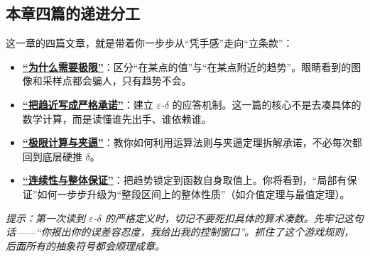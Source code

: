 \subsection*{本章四篇的递进分工}

这一章的四篇文章，就是带着你一步步从“凭手感”走向“立条款”：

\begin{itemize}
\item \hyperref[sec:02-Calculus/02-Limits-and-Continuity/01]{\textbf{“为什么需要极限”}}：区分“在某点的值”与“在某点附近的趋势”。眼睛看到的图像和采样点都会骗人，只有趋势不会。
\item \hyperref[sec:02-Calculus/02-Limits-and-Continuity/02]{\textbf{“把趋近写成严格承诺”}}：建立 $\varepsilon$-$\delta$ 的应答机制。这一篇的核心不是去凑具体的数学计算，而是读懂谁先出手、谁依赖谁。
\item \hyperref[sec:02-Calculus/02-Limits-and-Continuity/03]{\textbf{“极限计算与夹逼”}}：教你如何利用运算法则与夹逼定理拆解承诺，不必每次都回到底层硬推 $\delta$。
\item \hyperref[sec:02-Calculus/02-Limits-and-Continuity/04]{\textbf{“连续性与整体保证”}}：把趋势锁定到函数自身取值上。你将看到，“局部有保证”如何一步步升级为“整段区间上的整体性质”（如介值定理与最值定理）。
\end{itemize}

\textit{提示：第一次读到 $\varepsilon$-$\delta$ 的严格定义时，切记不要死扣具体的算术凑数。先牢记这句话——“你报出你的误差容忍度，我给出我的控制窗口”。抓住了这个游戏规则，后面所有的抽象符号都会顺理成章。}